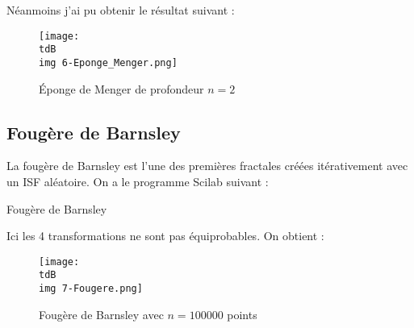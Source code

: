 		Néanmoins j'ai pu obtenir le résultat suivant :
		\begin{figure}[H]
			\centering
			\texttt{[image: \\tdB\\img 6-Eponge\_Menger.png]}
			\caption{Éponge de Menger de profondeur $n=2$}
			\label{img-2-epongeMenger}
		\end{figure}


	\subsection{Fougère de Barnsley}

		La fougère de Barnsley est l'une des premières fractales créées itérativement avec un ISF aléatoire.
		On a le programme Scilab suivant :
		\begin{listing}[H]
			\caption{Fougère de Barnsley}
			\label{code-2-fougere}
		\end{listing}

		Ici les 4 transformations ne sont pas équiprobables.
		On obtient :
		\begin{figure}[H]
			\centering
			\texttt{[image: \\tdB\\img 7-Fougere.png]}
			\caption{Fougère de Barnsley avec $n=100000$ points}
			\label{img-2-fougere}
		\end{figure}	








%

